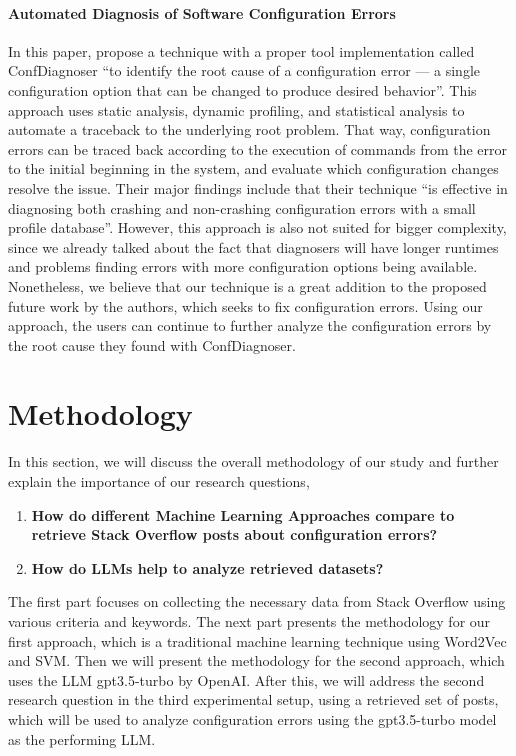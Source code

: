 \documentclass[english,bachelor]{swsLeipzig}
\begin{document}
\subsubsection{Automated Diagnosis of Software Configuration Errors}
In this paper, \citet{zhang:2013} propose a technique with a proper tool implementation called ConfDiagnoser 
``to identify the root cause of a configuration error --- a single configuration option that can be changed to produce desired behavior''. This approach uses static analysis, dynamic profiling, and statistical analysis to automate a traceback to the underlying root problem. That way, configuration errors can be traced back according to the execution of commands from the error to the initial beginning in the system, and evaluate which configuration changes resolve the issue. Their major findings include that their technique ``is effective in diagnosing both crashing and non-crashing configuration errors with a small profile database''. However, this approach is also not suited for bigger complexity, since we already talked about the fact that diagnosers will have longer runtimes and problems finding errors with more configuration options being available. Nonetheless, we believe that our technique is a great addition to the proposed future work by the authors, which seeks to fix configuration errors. Using our approach, the users can continue to further analyze the configuration errors by the root cause they found with ConfDiagnoser.

\chapter{Methodology}\label{methodology}
In this section, we will discuss the overall methodology of our study and further explain the importance of our research 
questions, 

\begin{enumerate}
  \item \textbf{How do different Machine Learning Approaches compare to retrieve Stack Overflow posts about configuration errors?}
  \item \textbf{How do LLMs help to analyze retrieved datasets?}
\end{enumerate}

The first part focuses on collecting the necessary data from Stack Overflow using various criteria and keywords. The next part presents the methodology for our first approach, which is a traditional machine learning technique using Word2Vec and SVM. Then we will present the methodology for the second approach, which uses the LLM gpt3.5-turbo by OpenAI. After this, we will address the second research question in the third experimental setup, using a retrieved set of posts, which will be used to analyze configuration errors using the gpt3.5-turbo model as the performing LLM.
\end{document}
